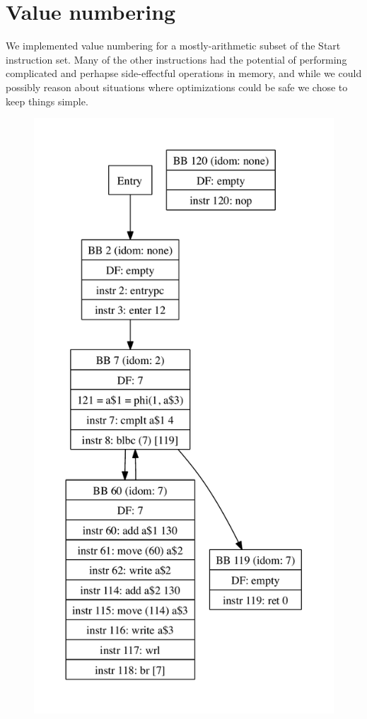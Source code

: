 \documentclass[10pt,twocolumn]{article}
\begin{document}
\section{Value numbering}

We implemented value numbering for a mostly-arithmetic subset of the
Start instruction set. Many of the other instructions had the
potential of performing complicated and perhapse side-effectful
operations in memory, and while we could possibly reason about
situations where optimizations could be safe we chose to keep things
simple.

\begin{figure}
\begin{center}
\vspace{-1in}
  \includegraphics[height=0.75\paperheight]{figs/andre3.pdf}

\end{center}
\end{figure}
\end{document}
